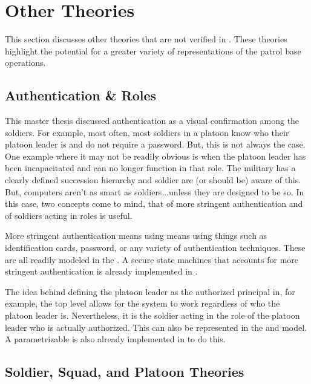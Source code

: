 \documentclass[../../main/main.tex]{subfiles}
\begin{document}
\chapter{Other Theories}\label{chp:other}
This section discusses other theories that are not verified in .  These theories highlight the potential for a greater variety of representations of the patrol base operations.  

\section{Authentication \& Roles}
This master thesis discussed authentication as a visual confirmation among the soldiers. For example, most often, most soldiers in a platoon know who their platoon leader is and do not require a password.  But, this is not always the case.  One example where it may not be readily obvious is when the platoon leader has been incapacitated and can no longer function in that role.  The military has a clearly defined succession hierarchy and soldier are (or should be) aware of this.  But, computers aren't as smart as soldiers...unless they are designed to be so.  In this case, two concepts come to mind, that of more stringent authentication and of soldiers acting in roles is useful.

More stringent authentication means using means using things such as identification cards, password, or any variety of authentication techniques.  These are all readily modeled in the .  A secure state machines that accounts for more stringent authentication is already implemented in .  

The idea behind defining the platoon leader as the authorized principal in, for example, the top level  allows for the system to work regardless of who the platoon leader is.  Nevertheless, it is the soldier acting in the role of the platoon leader who is actually authorized.  This can also be represented in the  and  model.  A parametrizable  is also already implemented in  to do this.


\section{Soldier, Squad, and Platoon Theories}
\end{document}
